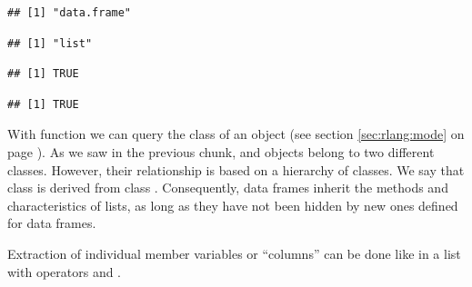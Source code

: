 \documentclass[krantz2]{krantz}\usepackage{knitr}
\begin{document}
\begin{knitrout}
\begin{kframe}
\begin{verbatim}
\end{verbatim}
\begin{alltt}
\end{alltt}
\begin{verbatim}
## [1] "data.frame"
\end{verbatim}
\begin{alltt}
\end{alltt}
\begin{verbatim}
## [1] "list"
\end{verbatim}
\begin{alltt}
\end{alltt}
\begin{verbatim}
## [1] TRUE
\end{verbatim}
\begin{alltt}
\end{alltt}
\begin{verbatim}
## [1] TRUE
\end{verbatim}
\end{kframe}
\end{knitrout}

With function  we can query the class of an \Rlang object (see section \ref{sec:rlang:mode} on page \pageref{sec:rlang:mode}). As we saw in the previous chunk,  and  objects belong to two different classes. However, their relationship is based on a hierarchy of classes. We say that class  is derived from class . Consequently, data frames inherit the methods and characteristics of lists, as long as they have not been hidden by new ones defined for data frames.

Extraction of individual member variables or ``columns'' can be done like in a list with operators \Roperator{[[ ]]} and \Roperator{\$}.
\end{document}
